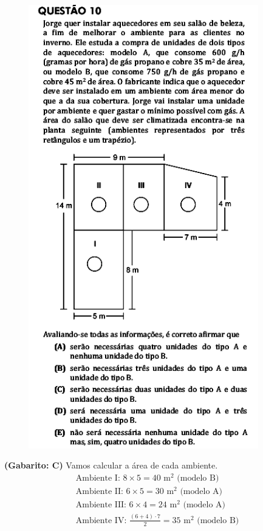 \documentclass[a4paper]{article}
\begin{document}
\begin{figure}[H]
	\begin{center}
		\includegraphics[width=10cm]{L5Q10.png}
	\end{center}
\end{figure}
\par\textbf{(Gabarito: C)} Vamos calcular a área de cada ambiente. 
\begin{align*}
\text{Ambiente I: } 8\times 5 = 40\text{ m}^2 \text{ (modelo B)} \\
\text{Ambiente II: } 6\times 5 = 30\text{ m}^2 \text{ (modelo A)} \\
\text{Ambiente III: } 6\times 4 = 24\text{ m}^2 \text{ (modelo A)} \\
\text{Ambiente IV: } \frac{(6+4)\cdot 7}{2} = 35\text{ m}^2 \text{ (modelo B)} 
\end{align*}
\end{document}

